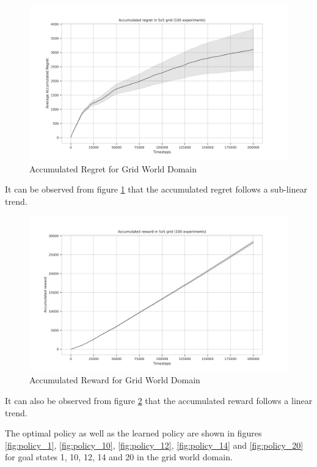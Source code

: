 \begin{figure}[!htbp]
    \centering
    \includegraphics[width=\linewidth]{experimentation/images/Accumulated regret in 5x5 grid (100 experiments).png}
    \caption{Accumulated Regret for Grid World Domain}
    \label{fig:regret}
\end{figure}

It can be observed from figure \ref{fig:regret} that the accumulated regret follows a sub-linear trend.

\begin{figure}[!htbp]
    \centering
    \includegraphics[width=\linewidth]{experimentation/images/Accumulated reward in 5x5 grid (100 experiments).png}
    \caption{Accumulated Reward for Grid World Domain}
    \label{fig:reward}
\end{figure}

It can also be observed from figure \ref{fig:reward} that the accumulated reward follows a linear trend.

The optimal policy as well as the learned policy are shown in figures \ref{fig:policy_1}, \ref{fig:policy_10}, \ref{fig:policy_12}, \ref{fig:policy_14} and \ref{fig:policy_20} for goal states 1, 10, 12, 14 and 20 in the grid world domain.

